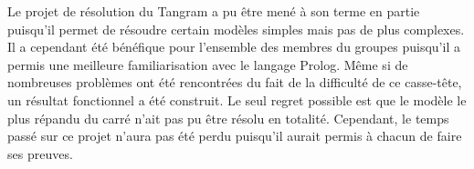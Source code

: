 \documentclass[a4paper, 11pt]{report}
\begin{document}
	Le projet de résolution du Tangram a pu être mené à son terme en partie puisqu'il permet de résoudre certain modèles simples mais pas de plus complexes. Il a cependant été bénéfique pour l'ensemble des membres du groupes puisqu'il a permis une meilleure familiarisation avec le langage Prolog. Même si de nombreuses problèmes ont été rencontrées du fait de la difficulté de ce casse-tête, un résultat fonctionnel a été construit. Le seul regret possible est que le modèle le plus répandu du carré n'ait pas pu être résolu en totalité. Cependant, le temps passé sur ce projet n'aura pas été perdu puisqu'il aurait permis à chacun de faire ses preuves.
	
	
	
	
		
	\newpage	
		
	\tableofcontents
\end{document}
